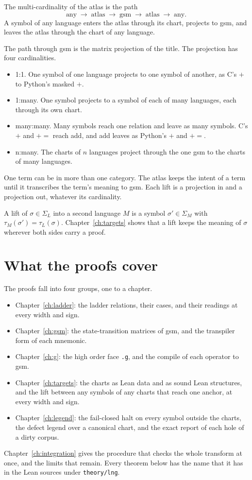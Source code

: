 \begin{definition}
The multi-cardinality of the atlas is the path
\[
  \text{any} \;\to\; \text{atlas} \;\to\; \text{gsm} \;\to\; \text{atlas} \;\to\; \text{any}.
\]
A symbol of any language enters the atlas through its chart, projects to gsm, and leaves the atlas through the
chart of any language.
\end{definition}

The path through gsm is the matrix projection of the title. The projection has four cardinalities.
\begin{itemize}
  \item 1:1. One symbol of one language projects to one symbol of another, as C's $+$ to Python's masked $+$.
  \item 1:many. One symbol projects to a symbol of each of many languages, each through its own chart.
  \item many:many. Many symbols reach one relation and leave as many symbols. C's $+$ and $+{=}$ reach add, and
        add leaves as Python's $+$ and $+{=}$.
  \item n:many. The charts of $n$ languages project through the one gsm to the charts of many languages.
\end{itemize}
One term can be in more than one category. The atlas keeps the intent of a term until it transcribes the term's
meaning to gsm. Each lift is a projection in and a projection out, whatever its cardinality.

A lift of $\sigma \in \Sigma_L$ into a second language $M$ is a symbol $\sigma' \in \Sigma_M$ with
$\tau_M(\sigma') = \tau_L(\sigma)$. Chapter~\ref{ch:targets} shows that a lift keeps the meaning of $\sigma$
wherever both sides carry a proof.

\section{What the proofs cover}

The proofs fall into four groups, one to a chapter.
\begin{itemize}
  \item Chapter~\ref{ch:ladder}: the ladder relations, their cases, and their readings at every width and sign.
  \item Chapter~\ref{ch:gsm}: the state-transition matrices of gsm, and the transpiler form of each mnemonic.
  \item Chapter~\ref{ch:g}: the high order face \texttt{.g}, and the compile of each operator to gsm.
  \item Chapter~\ref{ch:targets}: the charts as Lean data and as sound Lean structures, and the lift between any
        symbols of any charts that reach one anchor, at every width and sign.
  \item Chapter~\ref{ch:legend}: the fail-closed halt on every symbol outside the charts, the defect legend over a
        canonical chart, and the exact report of each hole of a dirty corpus.
\end{itemize}
Chapter~\ref{ch:integration} gives the procedure that checks the whole transform at once, and the limits that
remain. Every theorem below has the name that it has in the Lean sources under \texttt{theory/lng}.
